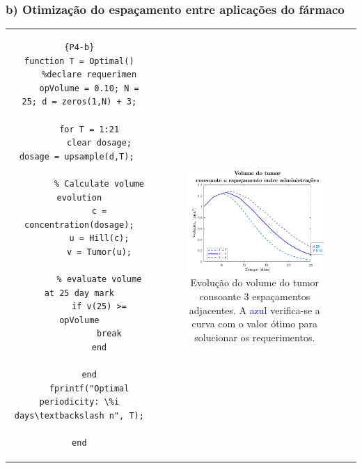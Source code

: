 \subsubsection{b) Otimização do espaçamento entre aplicações do fármaco}
\label{subsubsec:P4b}
\vspace{-1em}
\begin{tabular}{c c}%
    \hspace*{-1em}\noindent\begin{minipage}[t]{0.475\textwidth}
\begin{lstlisting}[title=Pergunta 4 - Aquisição do espaçamento,frame=tlrb]{P4-b}
function T = Optimal()
    %declare requerimen
    opVolume = 0.10; N = 25; d = zeros(1,N) + 3;
    
    for T = 1:21
        clear dosage; dosage = upsample(d,T); 

        % Calculate volume evolution
        c = concentration(dosage);
        u = Hill(c);
        v = Tumor(u);

        % evaluate volume at 25 day mark
        if v(25) >= opVolume
            break
        end
    
    end
    fprintf("Optimal periodicity: \%i days\textbackslash n", T);
    
end
\end{lstlisting}
    \end{minipage} &\
    \noindent\begin{minipage}[t]{0.5\textwidth}
        \begin{figure}[H]
            \vspace{-0.4em}
            \hspace*{-1.25em}
            \includegraphics[width = 1\linewidth]{img/perguntas/P4/P4-b.png}
            \caption{Evolução do volume do tumor consoante 3 espaçamentos adjacentes. A \textcolor{blue}{azul} verifica-se a curva com o valor ótimo para solucionar os requerimentos.}
            \label{fig:P4-b}
        \end{figure}
    \end{minipage}
\end{tabular}

